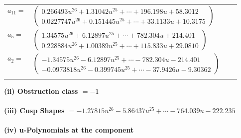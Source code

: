 \documentclass[1p]{elsarticle_modified}
\theoremstyle{definition}
\begin{document}
\begin{tabular}{m{7pt} m{180pt} m{7pt} m{180pt} }
\flushright $a_{11}=$&$\begin{pmatrix}0.266493 u^{26}+1.31042 u^{25}+\cdots+196.198 u+58.3012\\0.0227747 u^{26}+0.151445 u^{25}+\cdots+33.1133 u+10.3175\end{pmatrix}$ \\
\flushright $a_{5}=$&$\begin{pmatrix}1.34575 u^{26}+6.12897 u^{25}+\cdots+782.304 u+214.401\\0.228884 u^{26}+1.00389 u^{25}+\cdots+115.833 u+29.0810\end{pmatrix}$ \\
\flushright $a_{2}=$&$\begin{pmatrix}-1.34575 u^{26}-6.12897 u^{25}+\cdots-782.304 u-214.401\\-0.0973818 u^{26}-0.399745 u^{25}+\cdots-37.9426 u-9.30362\end{pmatrix}$\\&\end{tabular}
\flushleft \textbf{(ii) Obstruction class $= -1$}\\~\\
\flushleft \textbf{(iii) Cusp Shapes $= -1.27815 u^{26}-5.86437 u^{25}+\cdots-764.039 u-222.235$}\\~\\
\newpage\renewcommand{\arraystretch}{1}
\flushleft \textbf{(iv) u-Polynomials at the component}\newline \\
\end{document}
